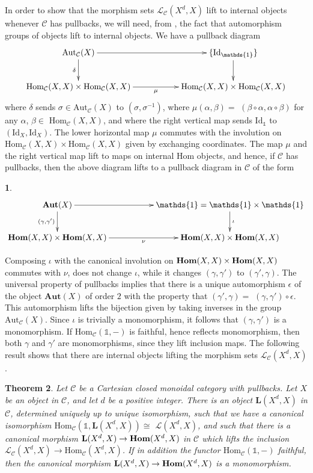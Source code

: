 \documentclass{amsart} %
\theoremstyle{plain}\newtheorem{Theorem}{Theorem}[section]
\theoremstyle{plain}\newtheorem{Conjecture}[Theorem]{Conjecture}
\theoremstyle{plain}\newtheorem{Corollary}[Theorem]{Corollary}
\theoremstyle{plain}\newtheorem{Lemma}[Theorem]{Lemma}
\theoremstyle{plain}\newtheorem{Proposition}[Theorem]{Proposition}
\theoremstyle{definition}\newtheorem{Definition}[Theorem]{Definition}
\theoremstyle{definition}\newtheorem{Example}[Theorem]{Example}
\theoremstyle{definition}\newtheorem{Examples}[Theorem]{Examples}
\theoremstyle{definition}\newtheorem{Remark}[Theorem]{Remark}
\theoremstyle{definition}\newtheorem{Remarks}[Theorem]{Remarks}
\theoremstyle{plain}\newtheorem{Statement}[Theorem]{}
\def\CC{{\mathcal{C}}}    \def\OP{{\mathcal{O}P}}
\def\CL{{\mathcal{L}}}  \def\bCL{{\mathbf{L}}}
\def\One{{\mathds{1}}}
\def\Aut{\mathrm{Aut}}   \def\bAut{\mathbf{Aut}}        \def\tenk{\otimes_k}
\def\Hom{\mathrm{Hom}}           \def\tenkS{\otimes_{kS}}
\def\Id{\mathrm{Id}}             \def\tenA{\otimes_A}
\begin{document}
In order to show that the morphism sets $\CL_\CC(X^d,X)$ lift to internal objects whenever
$\CC$ has pullbacks,  we will need, from 
 \cite[Exercise 5, page 213]{MacMoe}, the fact that automorphism groups of objects lift to
 internal objects.  We have a pullback diagram
$$\xymatrix{\Aut_\CC(X) \ar[rr] \ar[d]_{\delta} & & \{\Id_\One\} \ar[d] \\
\Hom_\CC(X,X)\times \Hom_\CC(X,X) \ar[rr]_{\mu} & & \Hom_\CC(X,X)\times \Hom_\CC(X,X) 
}$$
where $\delta$ sends $\sigma\in\Aut_\CC(X)$ to $(\sigma,\sigma^{-1})$, where
$\mu(\alpha,\beta)=$ $(\beta\circ\alpha, \alpha\circ\beta)$ for any 
$\alpha$, $\beta\in$ $\Hom_\CC(X,X)$, and where the right vertical map
sends $\Id_\One$ to $(\Id_X,\Id_X)$. The lower horizontal map $\mu$ commutes with the
involution on $\Hom_\CC(X,X)\times \Hom_\CC(X,X)$ given by exchanging coordinates.
The map $\mu$ and the right
vertical map lift to maps on internal Hom objects, and hence, if $\CC$ has pullbacks, then
the above diagram lifts to a pullback diagram in $\CC$ of the form
\begin{Statement} \label{bAut} 
$$\xymatrix{
\bAut(X) \ar[rr] \ar[d]_{(\gamma,\gamma')} & & \One = \One\times \One \ar[d]^{\iota} \\
\bHom(X,X)\times \bHom(X,X) \ar[rr]_{\nu} & & \bHom(X,X)\times \bHom(X,X)
}$$
\end{Statement} 
Composing $\iota$ with the canonical involution on $\mathbf{Hom}(X,X)\times\mathbf{Hom}(X,X)$ commutes
with $\nu$, 
does not change $\iota$, while it changes $(\gamma, \gamma')$ to $(\gamma',\gamma)$.
The universal property of pullbacks implies that there is a unique automorphism
$\epsilon$ of the object $\bAut(X)$ of order $2$ with the property that
$(\gamma',\gamma)=$ $(\gamma,\gamma')\circ\epsilon$. This automorphism lifts
the bijection given  by taking inverses in the group $\Aut_\CC(X)$. Since $\iota$ is
trivially a monomorphism, it follows that $(\gamma,\gamma')$ is a monomorphism.
If $\Hom_\CC(\One,-)$ is faithful, hence reflects monomorphism, then both
 $\gamma$ and $\gamma'$ are  monomorphisms, since they lift inclusion maps.
The following result shows that there are internal objects lifting the morphism sets $\CL_\CC(X^d,X)$.



\begin{Theorem} \label{thm3}
Let $\CC$ be a Cartesian closed monoidal category with pullbacks. Let $X$ be an object in $\CC$,
and let $d$ be a  positive integer. 
There is an object $\bCL(X^d,X)$ in $\CC$, determined uniquely up to unique isomorphism,
such that we have a canonical
isomorphism $\Hom_\CC(\One,\bCL(X^d,X))\cong$ $\CL(X^d,X)$, and such that there
is a canonical morphism $\bCL(X^d,X) \to \bHom(X^d,X)$ in $\CC$ which 
lifts the inclusion $\CL_\CC(X^d,X) \to \Hom_\CC(X^d,X)$. If in addition the functor 
$\Hom_\CC(\One,-)$ faithful, then the canonical morphism $\bCL(X^d,X) \to \bHom(X^d,X)$ 
is a monomorphism.
\end{Theorem} 
\end{document}
